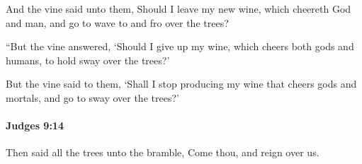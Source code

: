 			\begin{versebox}
					\item[BHS] 
					\item[ASV] And the vine said unto them, Should I leave my new wine, which cheereth God and man, and go to wave to and fro over the trees?
					\item[NIV] “But the vine answered, ‘Should I give up my wine, which cheers both gods and humans, to hold sway over the trees?’
					\item[NRSV] But the vine said to them, ‘Shall I stop producing my wine that cheers gods and mortals, and go to sway over the trees?’
			\end{versebox}

		\paragraph{Judges 9:14} %
			\label{JUDGES-9-14}

			Then said all the trees unto the bramble, Come thou, and reign over us.


